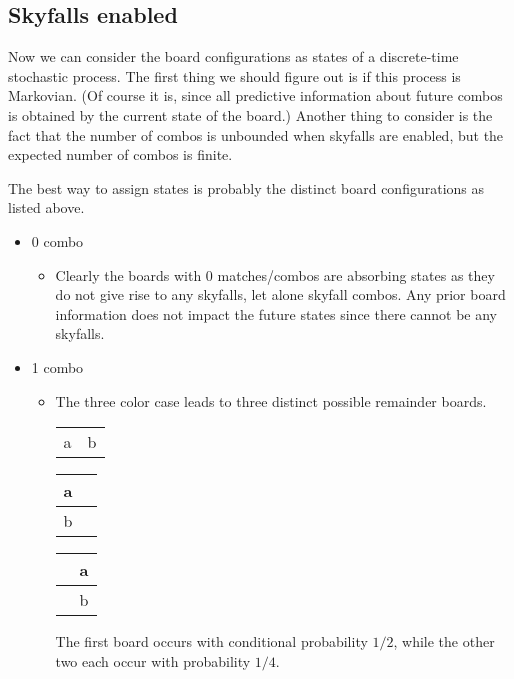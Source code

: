 \documentclass[12pt]{article}
\theoremstyle{definition}
\begin{document}
\subsection{Skyfalls enabled}
Now we can consider the board configurations as states of a discrete-time stochastic process. The first thing we should figure out is if this process is Markovian. (Of course it is, since all predictive information about future combos is obtained by the current state of the board.) Another thing to consider is the fact that the number of combos is unbounded when skyfalls are enabled, but the expected number of combos is finite.

The best way to assign states is probably the distinct board configurations as listed above.

\begin{itemize}
    \item 0 combo
    \begin{itemize}
        \item Clearly the boards with 0 matches/combos are absorbing states as they do not give rise to any skyfalls, let alone skyfall combos. Any prior board information does not impact the future states since there cannot be any skyfalls.
    \end{itemize}
    \item 1 combo
    \begin{itemize}
        \item The three color case leads to three distinct possible remainder boards.
        \begin{center}
            \begin{tabular}{|c|c|}
            \hline
             &  \\
            \hline
            a & b \\
            \hline
            \end{tabular}
            \qquad
            \begin{tabular}{|c|c|}
            \hline
            a & \phantom{a} \\
            \hline
            b & \phantom{a} \\
            \hline
            \end{tabular}
            \qquad
            \begin{tabular}{|c|c|}
            \hline
            \phantom{a} & a \\
            \hline
            \phantom{a} & b \\
            \hline
            \end{tabular}
        \end{center}
        The first board occurs with conditional probability $1/2$, while the other two each occur with probability $1/4$.
        

\end{itemize}
\end{itemize}
\end{document}
